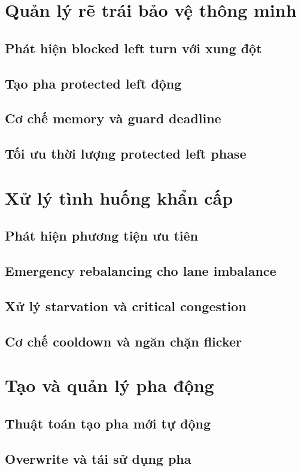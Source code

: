 \section{Quản lý rẽ trái bảo vệ thông minh}
\subsection{Phát hiện blocked left turn với xung đột}
\subsection{Tạo pha protected left động}
\subsection{Cơ chế memory và guard deadline}
\subsection{Tối ưu thời lượng protected left phase}

\section{Xử lý tình huống khẩn cấp}
\subsection{Phát hiện phương tiện ưu tiên}
\subsection{Emergency rebalancing cho lane imbalance}
\subsection{Xử lý starvation và critical congestion}
\subsection{Cơ chế cooldown và ngăn chặn flicker}

\section{Tạo và quản lý pha động}
\subsection{Thuật toán tạo pha mới tự động}
\subsection{Overwrite và tái sử dụng pha}

